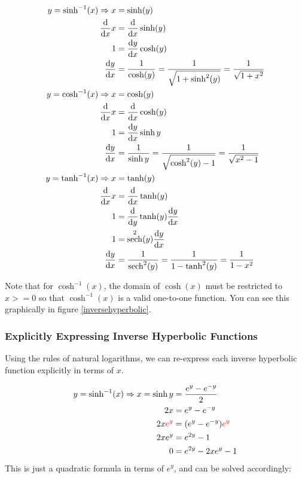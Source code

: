 \documentclass[12pt]{article}
\DeclareMathOperator{\sech}{sech}
\begin{document}
\begin{equation}
    \begin{split}
        y = \sinh^{-1}(x) \Rightarrow x &= \sinh (y)\\
        \ddx x &= \ddx \sinh(y) \\
        1 &= \dydx \cosh(y)\\
        \dydx &= \frac{1}{\cosh(y)} = \frac{1}{\sqrt{1 + \sinh^2(y)}} = \frac{1}{\sqrt{1+x^2}}\\
        y = \cosh^{-1}(x) \Rightarrow x &= \cosh(y)\\
        \ddx x &= \ddx \cosh(y)\\
        1 &= \dydx \sinh y\\
        \dydx &= \frac{1}{\sinh y} = \frac{1}{\sqrt{\cosh^2(y)-1}} = \frac{1}{\sqrt{x^2-1}}\\
        y = \tanh^{-1}(x) \Rightarrow x &= \tanh(y)\\
        \ddx x &= \ddx \tanh(y)\\
        1 &= \ddy \tanh(y) \dydx\\
        1 &= \sech^2(y) \dydx\\
        \dydx &= \frac{1}{\sech^2(y)} = \frac{1}{1-\tanh^2(y)} = \frac{1}{1-x^2}
    \end{split}
\end{equation}

Note that for $\cosh^{-1}(x)$, the domain of $\cosh(x)$ must be restricted to $x>=0$ so that $\cosh^{-1}(x)$ is a valid one-to-one function. You can see this graphically in figure \ref{inversehyperbolic}.

\subsubsection{Explicitly Expressing Inverse Hyperbolic Functions}

Using the rules of natural logarithms, we can re-express each inverse hyperbolic function explicitly in terms of $x$.

\begin{equation}
    \begin{split}
        y=\sinh^{-1}(x) \Rightarrow x = \sinh y &= \frac{e^y-e^{-y}}{2}\\
        2x &= e^y-e^{-y}\\
        2x\textcolor{red}{e^y} &= (e^y-e^{-y})\textcolor{red}{e^y}\\
        2xe^y &= e^{2y} - 1\\
        0 &= e^{2y} - 2xe^y -1\\
    \end{split}
\end{equation}
This is just a quadratic formula in terms of $e^y$, and can be solved accordingly:
\end{document}
